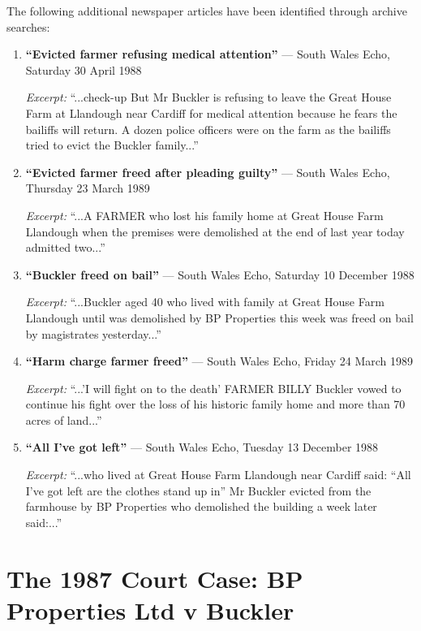 \documentclass[11pt,a4paper]{article}
\begin{document}
The following additional newspaper articles have been identified through archive searches:

\begin{enumerate}[label=\arabic*.]
    \item \textbf{``Evicted farmer refusing medical attention''} --- South Wales Echo, Saturday 30 April 1988
    
    \textit{Excerpt:} ``...check-up But Mr Buckler is refusing to leave the Great House Farm at Llandough near Cardiff for medical attention because he fears the bailiffs will return. A dozen police officers were on the farm as the bailiffs tried to evict the Buckler family...''
    
    \item \textbf{``Evicted farmer freed after pleading guilty''} --- South Wales Echo, Thursday 23 March 1989
    
    \textit{Excerpt:} ``...A FARMER who lost his family home at Great House Farm Llandough when the premises were demolished at the end of last year today admitted two...''
    
    \item \textbf{``Buckler freed on bail''} --- South Wales Echo, Saturday 10 December 1988
    
    \textit{Excerpt:} ``...Buckler aged 40 who lived with family at Great House Farm Llandough until was demolished by BP Properties this week was freed on bail by magistrates yesterday...''
    
    \item \textbf{``Harm charge farmer freed''} --- South Wales Echo, Friday 24 March 1989
    
    \textit{Excerpt:} ``...'I will fight on to the death' FARMER BILLY Buckler vowed to continue his fight over the loss of his historic family home and more than 70 acres of land...''
    
    \item \textbf{``All I've got left''} --- South Wales Echo, Tuesday 13 December 1988
    
    \textit{Excerpt:} ``...who lived at Great House Farm Llandough near Cardiff said: ``All I've got left are the clothes stand up in'' Mr Buckler evicted from the farmhouse by BP Properties who demolished the building a week later said:...''
\end{enumerate}

\newpage

\section{The 1987 Court Case: BP Properties Ltd v Buckler}
\end{document}
